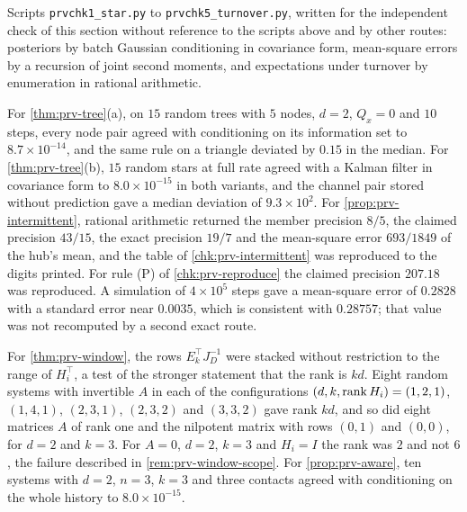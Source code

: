 \begin{numcheck}\label{chk:prv-independent}
Scripts \texttt{prvchk1\_star.py} to \texttt{prvchk5\_turnover.py}, written for the independent check of this section without reference to the scripts above and by other routes: posteriors by batch Gaussian conditioning in covariance form, mean-square errors by a recursion of joint second moments, and expectations under turnover by enumeration in rational arithmetic.

For \cref{thm:prv-tree}(a), on $15$ random trees with $5$ nodes, $d=2$, $Q_x=0$ and $10$ steps, every node pair agreed with conditioning on its information set to $8.7\times10^{-14}$, and the same rule on a triangle deviated by $0.15$ in the median. For \cref{thm:prv-tree}(b), $15$ random stars at full rate agreed with a Kalman filter in covariance form to $8.0\times10^{-15}$ in both variants, and the channel pair stored without prediction gave a median deviation of $9.3\times10^{2}$. For \cref{prop:prv-intermittent}, rational arithmetic returned the member precision $8/5$, the claimed precision $43/15$, the exact precision $19/7$ and the mean-square error $693/1849$ of the hub's mean, and the table of \cref{chk:prv-intermittent} was reproduced to the digits printed. For rule (P) of \cref{chk:prv-reproduce} the claimed precision $207.18$ was reproduced. A simulation of $4\times10^{5}$ steps gave a mean-square error of $0.2828$ with a standard error near $0.0035$, which is consistent with $0.28757$; that value was not recomputed by a second exact route.

For \cref{thm:prv-window}, the rows $E_k^\top J_D^{-1}$ were stacked without restriction to the range of $H_i^\top$, a test of the stronger statement that the rank is $kd$. Eight random systems with invertible $A$ in each of the configurations $(d,k,\operatorname{rank} H_i)=(1,2,1)$, $(1,4,1)$, $(2,3,1)$, $(2,3,2)$ and $(3,3,2)$ gave rank $kd$, and so did eight matrices $A$ of rank one and the nilpotent matrix with rows $(0,1)$ and $(0,0)$, for $d=2$ and $k=3$. For $A=0$, $d=2$, $k=3$ and $H_i=I$ the rank was $2$ and not $6$, the failure described in \cref{rem:prv-window-scope}. For \cref{prop:prv-aware}, ten systems with $d=2$, $n=3$, $k=3$ and three contacts agreed with conditioning on the whole history to $8.0\times10^{-15}$.


\end{numcheck}
